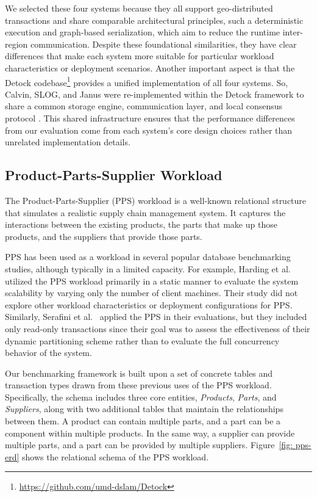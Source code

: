 We selected these four systems because they all support geo-distributed transactions and share comparable architectural principles, such a deterministic execution and graph-based serialization, which aim to reduce the runtime inter-region communication. Despite these foundational similarities, they have clear differences that make each system more suitable for particular workload characteristics or deployment scenarios. Another important aspect is that the Detock codebase\footnote{\url{https://github.com/umd-dslam/Detock}} provides a unified implementation of all four systems. So, Calvin, SLOG, and Janus were re-implemented within the Detock framework to share a common storage engine, communication layer, and local consensus protocol \cite{nguyen2023detock}. This shared infrastructure ensures that the performance differences from our evaluation come from each system's core design choices rather than unrelated implementation details.

\subsection{Product-Parts-Supplier Workload}
\label{subsec: product-parts-supplier-workload}
The Product-Parts-Supplier (PPS) workload is a well-known relational structure that simulates a realistic supply chain management system. It captures the interactions between the existing products, the parts that make up those products, and the suppliers that provide those parts.

PPS has been used as a workload in several popular database benchmarking studies, although typically in a limited capacity. For example, Harding et al.~\cite{harding2017evaluation} utilized the PPS workload primarily in a static manner to evaluate the system scalability by varying only the number of client machines. Their study did not explore other workload characteristics or deployment configurations for PPS. Similarly, Serafini et al.~\cite{serafini2016clay} applied the PPS in their evaluations, but they included only read-only transactions since their goal was to assess the effectiveness of their dynamic partitioning scheme rather than to evaluate the full concurrency behavior of the system.

Our benchmarking framework is built upon a set of concrete tables and transaction types drawn from these previous uses of the PPS workload. Specifically, the schema includes three core entities, \textit{Products}, \textit{Parts}, and \textit{Suppliers}, along with two additional tables that maintain the relationships between them. A product can contain multiple parts, and a part can be a component within multiple products. In the same way, a supplier can provide multiple parts, and a part can be provided by multiple suppliers. Figure~\ref{fig: pps-erd} shows the relational schema of the PPS workload.

